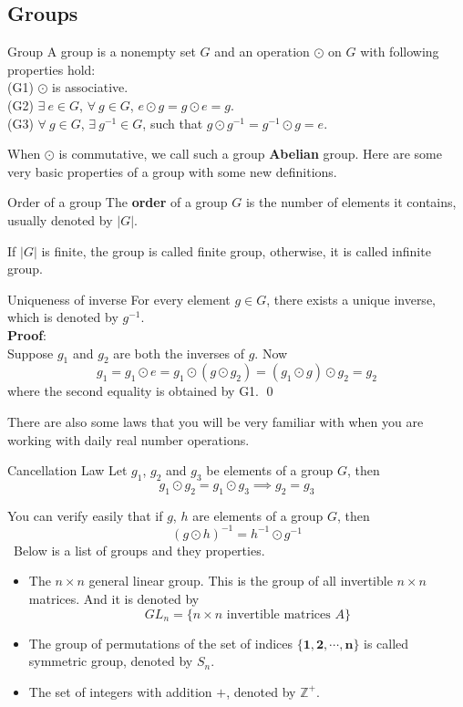 \documentclass{article}
\begin{document}
\subsection{Groups}
\begin{defin}{Group}
    A group is a nonempty set $G$ and an operation $\odot$ on $G$ with following properties hold:\\
    (G1) $\odot$ is associative.\\
    (G2) $\exists\ e \in G$, $\forall\ g \in G$, $e \odot g = g \odot e = g$.\\
    (G3) $\forall\ g \in G$, $\exists\ g^{-1} \in G$, such that $g \odot g^{-1} = g^{-1} \odot g = e$.
\end{defin}
When $\odot$ is commutative, we call such a group \textbf{Abelian} group. Here are some very basic properties of a group with some new definitions.
\begin{defin}{Order of a group}
    The \textbf{order} of a group $G$ is the number of elements it contains, usually denoted by $|G|$.

\end{defin}
If $|G|$ is finite, the group is called finite group, otherwise, it is called infinite group.
\begin{lemma}{Uniqueness of inverse}
    For every element $g \in G$, there exists a unique inverse, which is denoted by $g^{-1}$.\\
    \textbf{Proof}:\\
    Suppose $g_1$ and $g_2$ are both the inverses of $g$. Now
    $$
    g_1 = g_1 \odot e = g_1 \odot (g \odot g_2) = (g_1 \odot g) \odot g_2 = g_2
    $$
    where the second equality is obtained by G1.
    \qed

\end{lemma}
There are also some laws that you will be very familiar with when you are working with daily real number operations.
\begin{lemma}{Cancellation Law}
    Let $g_1$, $g_2$ and $g_3$ be elements of a group $G$, then
    $$
    g_1 \odot g_2 = g_1 \odot g_3 \implies g_2 = g_3
    $$
\end{lemma}
You can verify easily that if $g$, $h$ are elements of a group $G$, then
$$
(g \odot h)^{-1} = h^{-1} \odot g^{-1}
$$
\quad\ Below is a list of groups and they properties.
\begin{itemize}
    \item The $n \times n$ general linear group. This is the group of all invertible $n \times n$ matrices. And it is denoted by
    $$GL_n = \{n \times n \text{ invertible matrices }A\}$$
    \item The group of permutations of the set of indices $\{\mathbf{1, 2, \cdots, n}\}$ is called symmetric group, denoted by $S_n$.
    \item The set of integers with addition $+$, denoted by $\mathbb{Z}^+$.
\end{itemize}
\end{document}
